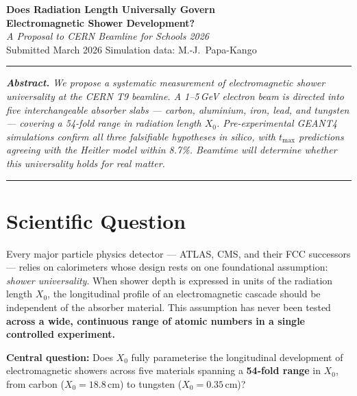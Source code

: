 \documentclass[11pt,a4paper]{article}
\begin{document}

\thispagestyle{fancy}
\begin{center}
  \vspace*{2pt}
  {\LARGE\bfseries\color{cerndark}
    Does Radiation Length Universally Govern\\[5pt]
    Electromagnetic Shower Development?}\\[11pt]
  {\large\itshape\color{gray}
    A Proposal to CERN Beamline for Schools 2026}\\[5pt]
  {\normalsize\color{gray}
    Submitted March 2026
    \quad\textbullet\quad
    Simulation data: M.-J.\ Papa-Kango}
\end{center}
{\color{cernblue}\rule{\linewidth}{2.5pt}}

\smallskip
\begin{center}
\small\itshape\color{gray}
\textbf{Abstract.}
We propose a systematic measurement of electromagnetic shower universality
at the CERN T9 beamline. A 1--5\,GeV electron beam is directed into five
interchangeable absorber slabs --- carbon, aluminium, iron, lead, and
tungsten --- covering a 54-fold range in radiation length $X_0$.
Pre-experimental GEANT4 simulations confirm all three falsifiable hypotheses
in silico, with $t_{\max}$ predictions agreeing with the Heitler model
within 8.7\%. Beamtime will determine whether this universality holds for
real matter.
\end{center}
{\color{cernblue!35}\rule{\linewidth}{0.5pt}}

\section{Scientific Question}
\label{sec:question}

Every major particle physics detector --- ATLAS, CMS, and their FCC
successors --- relies on calorimeters whose design rests on one foundational
assumption: \emph{shower universality}. When shower depth is expressed in
units of the radiation length $X_0$, the longitudinal profile of an
electromagnetic cascade should be independent of the absorber material.
This assumption has never been tested \textbf{across a wide, continuous
range of atomic numbers in a single controlled experiment.}

\begin{keybox}
\textbf{Central question:}
Does $X_0$ fully parameterise the longitudinal development of
electromagnetic showers across five materials spanning a \textbf{54-fold
range} in $X_0$, from carbon ($X_0 = 18.8$\,cm) to tungsten
($X_0 = 0.35$\,cm)?
\end{keybox}
\end{document}
